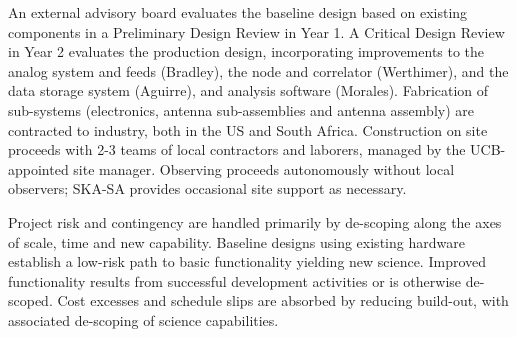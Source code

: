 \documentclass[preprint]{aastex}
\begin{document}
An external advisory board evaluates the baseline design
based on existing components in a Preliminary Design Review in Year 1.
A Critical Design Review in Year 2 evaluates the
production design, incorporating improvements to the analog system
and feeds (Bradley), the node and correlator (Werthimer), and the data storage
system (Aguirre), and analysis software (Morales).
Fabrication of sub-systems (electronics, antenna sub-assemblies and antenna assembly)
are contracted to industry, both in the US and South Africa.   Construction on site proceeds
with 2-3 teams of local contractors and laborers, managed by the UCB-appointed site manager.  Observing proceeds autonomously without local observers; SKA-SA
provides occasional site support as necessary.

Project risk and contingency are handled primarily by de-scoping along the axes of scale, time and new capability.  Baseline designs using
existing hardware establish a low-risk path to basic functionality yielding new science.  Improved functionality
results from successful development activities or is otherwise de-scoped.
Cost excesses and schedule slips are absorbed by reducing
build-out, with associated de-scoping of science capabilities.
\end{document}
